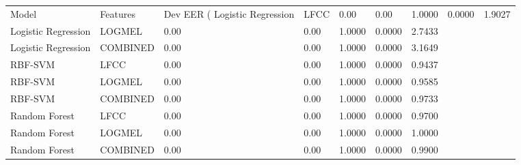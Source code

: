 \begin{tabular}{lllllll}
\toprule
Model & Features & Dev EER (%
\midrule
Logistic Regression & LFCC & 0.00 & 0.00 & 1.0000 & 0.0000 & 1.9027 \\
Logistic Regression & LOGMEL & 0.00 & 0.00 & 1.0000 & 0.0000 & 2.7433 \\
Logistic Regression & COMBINED & 0.00 & 0.00 & 1.0000 & 0.0000 & 3.1649 \\
RBF-SVM & LFCC & 0.00 & 0.00 & 1.0000 & 0.0000 & 0.9437 \\
RBF-SVM & LOGMEL & 0.00 & 0.00 & 1.0000 & 0.0000 & 0.9585 \\
RBF-SVM & COMBINED & 0.00 & 0.00 & 1.0000 & 0.0000 & 0.9733 \\
Random Forest & LFCC & 0.00 & 0.00 & 1.0000 & 0.0000 & 0.9700 \\
Random Forest & LOGMEL & 0.00 & 0.00 & 1.0000 & 0.0000 & 1.0000 \\
Random Forest & COMBINED & 0.00 & 0.00 & 1.0000 & 0.0000 & 0.9900 \\
\bottomrule
\end{tabular}
